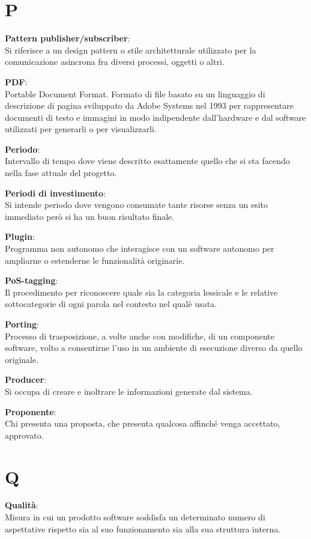 \documentclass[a4paper, oneside, openany, dvipsnames, table]{article}
\begin{document}
\newpage
\section{P}
\textbf{Pattern publisher/subscriber}:\\	 Si riferisce a un design pattern o stile architetturale utilizzato per la comunicazione asincrona fra diversi processi, oggetti o altri.

\textbf{PDF}:\\	Portable Document Format. Formato di file basato su un linguaggio di descrizione di pagina sviluppato da Adobe Systems nel 1993 per rappresentare documenti di testo e immagini in modo indipendente dall'hardware e dal software utilizzati per generarli o per visualizzarli.

\textbf{Periodo}:\\	Intervallo di tempo dove viene descritto esattamente quello che si sta facendo nella fase attuale del progetto.

\textbf{Periodi di investimento}:\\	Si intende periodo dove vengono consumate tante risorse senza un esito immediato però si ha un buon risultato finale.

\textbf{Plugin}:\\	Programma non autonomo che interagisce con un software autonomo per ampliarne o estenderne le funzionalità originarie.

\textbf{PoS-tagging}:\\	Il procedimento per riconoscere quale sia la categoria lessicale e le relative sottocategorie di ogni parola nel contesto nel qualè usata.

\textbf{Porting}:\\	Processo di trasposizione, a volte anche con modifiche, di un componente software, volto a consentirne l'uso in un ambiente di esecuzione diverso da quello originale.

\textbf{Producer}:\\	Si occupa di creare e inoltrare le informazioni generate dal sistema.

\textbf{Proponente}:\\	Chi presenta una proposta, che presenta qualcosa affinché venga accettato, approvato.


\newpage
\section{Q}
\textbf{Qualità}:\\	Misura in cui un prodotto software soddisfa un determinato numero di aspettative rispetto sia al suo funzionamento sia alla sua struttura interna.
\end{document}

